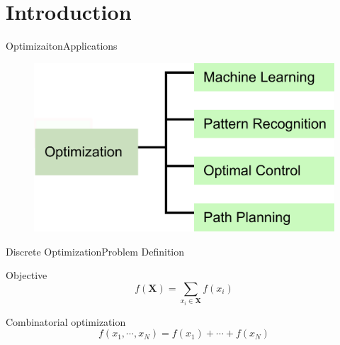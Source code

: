 \section{Introduction}

\begin{frame}{Optimizaiton}{Applications}
\begin{figure}
	\centering
	\includegraphics[width = .8\textwidth]{./figure/optimization}
\end{figure}
\end{frame}

\begin{frame}{Discrete Optimization}{Problem Definition}
\begin{block}{Objective}
\begin{equation}
\nonumber
f( \mathbf{X} ) = \sum_{ x_{i} \in \mathbf{X} } f(x_{i})
\end{equation}
\end{block}

\begin{block}{}
Combinatorial optimization
\begin{equation}
\nonumber
f(x_{1} , \cdots , x_{N} )= f(x_{1}) + \cdots + f(x_{N})
\end{equation}
\end{block}
\end{frame}


